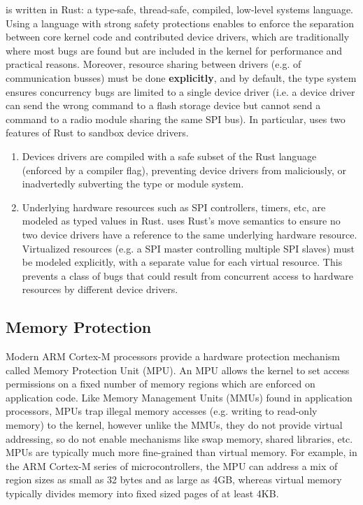 \name is written in Rust: a type-safe, thread-safe, compiled, low-level systems
language. Using a language with strong safety protections enables \name to
enforce the separation between core kernel code and contributed device
drivers, which are traditionally where most bugs are found but are included in
the kernel for performance and practical reasons. Moreover, resource sharing
between drivers (e.g. of communication busses) must be done {\bf explicitly}, and
by default, the type system ensures concurrency bugs are limited to a single
device driver (i.e. a device driver can send the wrong command to a flash
storage device but cannot send a command to a radio module sharing the same SPI
bus). In particular, \name uses two features of Rust to sandbox device drivers.

\begin{enumerate}
  \item Devices drivers are compiled with a safe subset of the Rust language
  (enforced by a compiler flag), preventing device drivers from maliciously, or
  inadvertedly subverting the type or module system.

  \item Underlying hardware resources such as SPI controllers, timers, etc, are
    modeled as typed values in Rust. \name uses Rust's move semantics to ensure
    no two device drivers have a reference to the same underlying hardware
    resource. Virtualized resources (e.g. a SPI master controlling multiple SPI
    slaves) must be modeled explicitly, with a separate value for each virtual
    resource. This prevents a class of bugs that could result from concurrent
    access to hardware resources by different device drivers.

\end{enumerate} 

\subsection{Memory Protection}

Modern ARM Cortex-M processors provide a hardware protection mechanism called
Memory Protection Unit (MPU).  An MPU allows the kernel to set access
permissions on a fixed number of memory regions which are enforced on
application code. Like Memory Management Units (MMUs) found in application
processors, MPUs trap illegal memory accesses (e.g. writing to read-only
memory) to the kernel, however unlike the MMUs, they do not provide virtual
addressing, so do not enable mechanisms like swap memory, shared libraries,
etc. MPUs are typically much more fine-grained than virtual memory. For
example, in the ARM Cortex-M series of microcontrollers, the MPU can address a
mix of region sizes as small as 32 bytes and as large as 4GB, whereas virtual
memory typically divides memory into fixed sized pages of at least 4KB.

